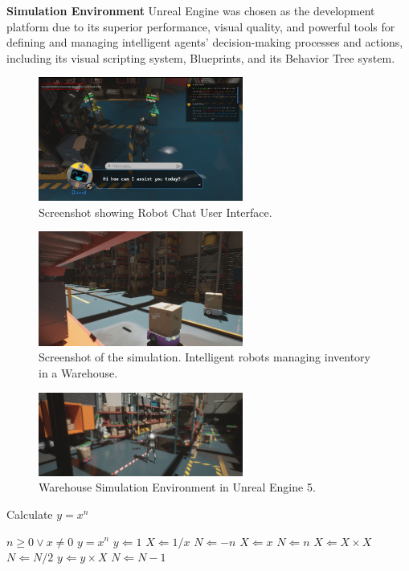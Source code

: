 \documentclass[pdflatex,sn-mathphys-num]{sn-jnl}%
\theoremstyle{thmstyleone}%
\theoremstyle{thmstyletwo}%
\theoremstyle{thmstylethree}%
\begin{document}
\textbf{Simulation Environment
}Unreal Engine was chosen as the development platform due to its superior performance, visual quality, and powerful tools for defining and managing intelligent agents' decision-making processes and actions, including its visual scripting system, Blueprints, and its Behavior Tree system.
\begin{figure}[h]
\centering
\includegraphics[width=0.6\textwidth]{figures/Picture9.png}
\caption{Screenshot showing Robot Chat User Interface.}\label{fig4}
\end{figure}
\begin{figure}[h]
\centering
\includegraphics[width=0.6\textwidth]{figures/Picture10.png}
\caption{Screenshot of the simulation. Intelligent robots managing inventory in a Warehouse.}\label{fig5}
\end{figure}
\begin{figure}[H]
\centering
\includegraphics[width=0.6\textwidth]{figures/Picture14.png}
\caption{Warehouse Simulation Environment in Unreal Engine 5.}\label{fig6}
\end{figure}
\begin{algorithm}
\caption{Calculate $y = x^n$}\label{algo1}
\begin{algorithmic}[1]
\Require $n \geq 0 \vee x \neq 0$
\Ensure $y = x^n$ 
\State $y \Leftarrow 1$
\label{algln2}
        \State $X \Leftarrow 1 / x$
        \State $N \Leftarrow -n$
\Else
        \State $X \Leftarrow x$
        \State $N \Leftarrow n$
\EndIf
{}
            \State $X \Leftarrow X \times X$
            \State $N \Leftarrow N / 2$
        \Else[$N$ is odd]
            \State $y \Leftarrow y \times X$
            \State $N \Leftarrow N - 1$
        \EndIf
\EndWhile
\end{algorithmic}
\end{algorithm}
\end{document}
